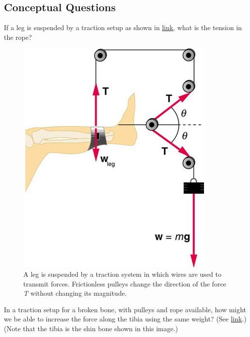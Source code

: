 \documentclass[
]{book}
\newenvironment{conceptual-questions}{}{}
\begin{document}
\hypertarget{fs-id1280043}{}
\begin{conceptual-questions}

\hypertarget{conceptual-questions-15}{%
\subsection{Conceptual Questions}\label{conceptual-questions-15}}

\hypertarget{fs-id2656274}{}
\leavevmode\hypertarget{fs-id2656276}{}%
If a leg is suspended by a traction setup as shown in
\protect\hyperlink{import-auto-id1436486}{link}, what is the
tension in the rope?

\begin{figure}
\hypertarget{import-auto-id1436486}{%
\centering
\includegraphics{images/Figure_04_05_10.jpg}
\caption{A leg is suspended by a traction system in which wires are used to
transmit forces. Frictionless pulleys change the direction of the force
\emph{T} without changing its
magnitude.}\label{import-auto-id1436486}
}
\end{figure}

\hypertarget{fs-id1384888}{}
\leavevmode\hypertarget{fs-id1602608}{}%
In a traction setup for a broken bone, with pulleys and rope available,
how might we be able to increase the force along the tibia using the
same weight? (See
\protect\hyperlink{import-auto-id1436486}{link}.) (Note that the
tibia is the shin bone shown in this image.)

\end{conceptual-questions}
\end{document}
